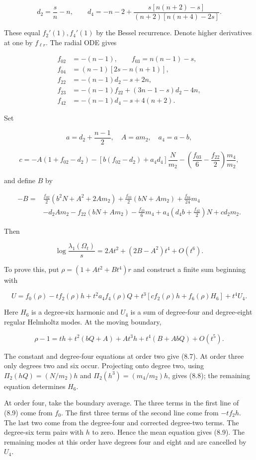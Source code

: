 \documentclass[11pt]{article}
\begin{document}
\[
d_2=\frac sn-n,\qquad
d_4=-n-2+\frac{s[n(n+2)-s]}{(n+2)[n(n+4)-2s]}.
\tag{8.5}
\]

These equal \(f_2'(1),f_4'(1)\) by the Bessel recurrence. Denote higher
derivatives at one by \(f_{\ell r}\). The radial ODE gives

\[
\begin{aligned}
f_{02}&=-(n-1),\qquad f_{03}=n(n-1)-s,\\
f_{04}&=(n-1)[2s-n(n+1)],\\
f_{22}&=-(n-1)d_2-s+2n,\\
f_{23}&=-(n-1)f_{22}+(3n-1-s)d_2-4n,\\
f_{42}&=-(n-1)d_4-s+4(n+2).
\end{aligned}
\tag{8.6}
\]

Set

\[
a=d_2+\frac{n-1}{2},\quad A=am_2,\quad a_4=a-b,
\tag{8.7}
\]

\[
c=-A(1+f_{02}-d_2)
-[b(f_{02}-d_2)+a_4d_4]\frac{N}{m_2}
-\left(\frac{f_{03}}6-\frac{f_{22}}2\right)\frac{m_4}{m_2},
\tag{8.8}
\]

and define \(B\) by

\[
\begin{aligned}
-B={}&\frac{f_{02}}2(b^2N+A^2+2Am_2)
+\frac{f_{03}}2(bN+Am_2)+\frac{f_{04}}{24}m_4\\
&-d_2Am_2-f_{22}(bN+Am_2)-\frac{f_{23}}6m_4
+a_4\left(d_4b+\frac{f_{42}}2\right)N+cd_2m_2.
\end{aligned}
\tag{8.9}
\]

Then

\[
\log\frac{\lambda_1(\Omega_t)}s
=2At^2+(2B-A^2)t^4+O(t^6).
\tag{8.10}
\]

To prove this, put \(\rho=(1+At^2+Bt^4)r\) and construct a finite sum
beginning with

\[
U=f_0(\rho)-tf_2(\rho)h+t^2a_4f_4(\rho)Q
+t^3[cf_2(\rho)h+f_6(\rho)H_6]+t^4U_4.
\tag{8.11}
\]

Here \(H_6\) is a degree-six harmonic and \(U_4\) is a sum of
degree-four and degree-eight regular Helmholtz modes. At the moving
boundary,

\[
\rho-1=th+t^2(bQ+A)+At^3h+t^4(B+AbQ)+O(t^5).
\tag{8.12}
\]

The constant and degree-four equations at order two give (8.7). At order
three only degrees two and six occur. Projecting onto degree two, using
\(\Pi_2(hQ)=(N/m_2)h\) and \(\Pi_2(h^3)=(m_4/m_2)h\), gives (8.8); the
remaining equation determines \(H_6\).

At order four, take the boundary average. The three terms in the first
line of (8.9) come from \(f_0\). The first three terms of the second
line come from \(-tf_2h\). The last two come from the degree-four and
corrected degree-two terms. The degree-six term pairs with \(h\) to
zero. Hence the mean equation gives (8.9). The remaining modes at this
order have degrees four and eight and are cancelled by \(U_4\).
\end{document}
